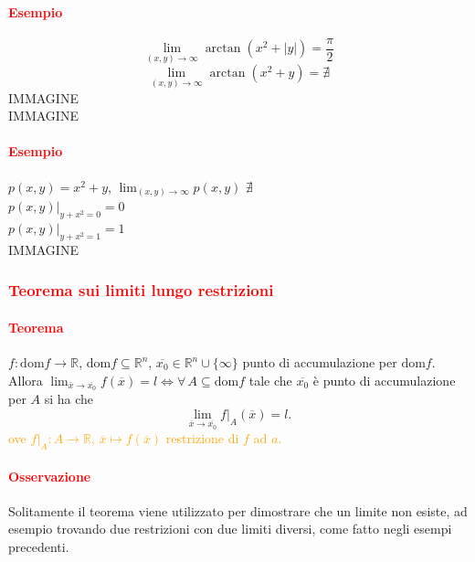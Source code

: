 \documentclass{article}
\newcommand{\R}{\mathbb{R}}
\newcommand{\dom}{\text{dom}}
\begin{document}
\paragraph{\textcolor{red}{Esempio}}
\begin{equation*}
    \lim_{(x,y)\rightarrow\infty} \arctan(x^2+|y|)=\frac{\pi}{2}
\end{equation*}
\begin{equation*}
    \lim_{(x,y)\rightarrow\infty} \arctan(x^2+y)= \nexists
\end{equation*}
IMMAGINE\\
IMMAGINE\\


\paragraph{\textcolor{red}{Esempio}}
$p(x,y)=x^2+y$, $\lim_{(x,y)\rightarrow\infty}p(x,y) \,\,\nexists$\\
$p(x,y)|_{y+x^2=0}=0$\\
$p(x,y)|_{y+x^2=1}=1$\\
IMMAGINE\\

\subsubsection{\textcolor{red}{Teorema sui limiti lungo restrizioni}}
\paragraph{\textcolor{red}{Teorema}}
$f:\dom f\rightarrow\R$, $\dom f \subseteq\R^n$, $\overline{x_0}\in \R^n\cup\{\infty\}$ punto di accumulazione per $\dom f$. Allora $\lim_{\overline{x}\rightarrow\overline{x_0}}f(\overline{x})=l\Leftrightarrow \forall\,A \subseteq \dom f$ tale che $\overline{x_0}$ è punto di accumulazione per $A$ si ha che 
\begin{equation*}
    \lim_{\overline{x}\rightarrow\overline{x_0}}f|_A(\overline{x})=l.
\end{equation*}
\textcolor{orange}{ove $f|_A:A\rightarrow \R$, $\overline{x}\mapsto f(\overline{x})$ restrizione di $f$ ad $a$.}

\paragraph{\textcolor{red}{Osservazione}}
Solitamente il teorema viene utilizzato per dimostrare che un limite non esiste, ad esempio trovando due restrizioni con due limiti diversi, come fatto negli esempi precedenti.
\end{document}
